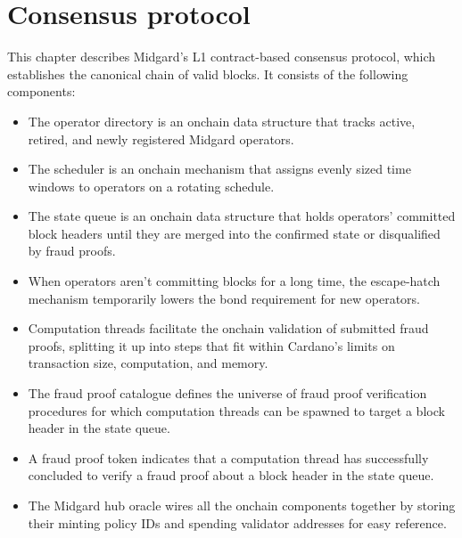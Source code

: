 \documentclass[../midgard.tex]{subfiles}
\begin{document}
\chapter{Consensus protocol}
\label{h:consensus-protocol}

This chapter describes Midgard's L1 contract-based consensus protocol, which establishes the canonical chain of valid blocks.
It consists of the following components:

\begin{itemize}
    \item The operator directory is an onchain data structure that tracks active, retired, and newly registered Midgard operators.
    \item The scheduler is an onchain mechanism that assigns evenly sized time windows to operators on a rotating schedule.
    \item The state queue is an onchain data structure that holds operators' committed block headers until they are merged into the confirmed state or disqualified by fraud proofs.
    \item When operators aren't committing blocks for a long time, the escape-hatch mechanism temporarily lowers the bond requirement for new operators.
    \item Computation threads facilitate the onchain validation of submitted fraud proofs, splitting it up into steps that fit within Cardano's limits on transaction size, computation, and memory.
    \item The fraud proof catalogue defines the universe of fraud proof verification procedures for which computation threads can be spawned to target a block header in the state queue.
    \item A fraud proof token indicates that a computation thread has successfully concluded to verify a fraud proof about a block header in the state queue.
    \item The Midgard hub oracle wires all the onchain components together by storing their minting policy IDs and spending validator addresses for easy reference.
\end{itemize}
\end{document}
